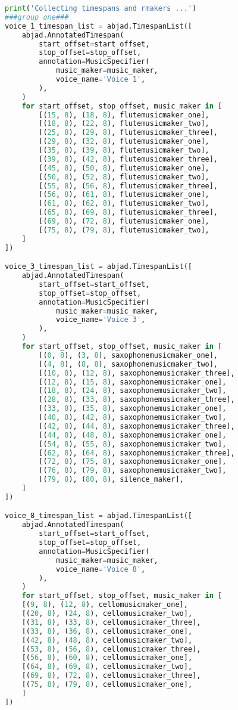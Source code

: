\begin{lstlisting}[language=Python, caption=Four Ages of Sand Segment\_II]
print('Collecting timespans and rmakers ...')
###group one###
voice_1_timespan_list = abjad.TimespanList([
    abjad.AnnotatedTimespan(
        start_offset=start_offset,
        stop_offset=stop_offset,
        annotation=MusicSpecifier(
            music_maker=music_maker,
            voice_name='Voice 1',
        ),
    )
    for start_offset, stop_offset, music_maker in [
        [(15, 8), (18, 8), flutemusicmaker_one],
        [(18, 8), (22, 8), flutemusicmaker_two],
        [(25, 8), (29, 8), flutemusicmaker_three],
        [(29, 8), (32, 8), flutemusicmaker_one],
        [(35, 8), (39, 8), flutemusicmaker_two],
        [(39, 8), (42, 8), flutemusicmaker_three],
        [(45, 8), (50, 8), flutemusicmaker_one],
        [(50, 8), (52, 8), flutemusicmaker_two],
        [(55, 8), (56, 8), flutemusicmaker_three],
        [(56, 8), (61, 8), flutemusicmaker_one],
        [(61, 8), (62, 8), flutemusicmaker_two],
        [(65, 8), (69, 8), flutemusicmaker_three],
        [(69, 8), (72, 8), flutemusicmaker_one],
        [(75, 8), (79, 8), flutemusicmaker_two],
    ]
])

voice_3_timespan_list = abjad.TimespanList([
    abjad.AnnotatedTimespan(
        start_offset=start_offset,
        stop_offset=stop_offset,
        annotation=MusicSpecifier(
            music_maker=music_maker,
            voice_name='Voice 3',
        ),
    )
    for start_offset, stop_offset, music_maker in [
        [(0, 8), (3, 8), saxophonemusicmaker_one],
        [(4, 8), (8, 8), saxophonemusicmaker_two],
        [(10, 8), (12, 8), saxophonemusicmaker_three],
        [(12, 8), (15, 8), saxophonemusicmaker_one],
        [(18, 8), (24, 8), saxophonemusicmaker_two],
        [(28, 8), (33, 8), saxophonemusicmaker_three],
        [(33, 8), (35, 8), saxophonemusicmaker_one],
        [(40, 8), (42, 8), saxophonemusicmaker_two],
        [(42, 8), (44, 8), saxophonemusicmaker_three],
        [(44, 8), (48, 8), saxophonemusicmaker_one],
        [(54, 8), (55, 8), saxophonemusicmaker_two],
        [(62, 8), (64, 8), saxophonemusicmaker_three],
        [(72, 8), (75, 8), saxophonemusicmaker_one],
        [(76, 8), (79, 8), saxophonemusicmaker_two],
        [(79, 8), (80, 8), silence_maker],
    ]
])

voice_8_timespan_list = abjad.TimespanList([
    abjad.AnnotatedTimespan(
        start_offset=start_offset,
        stop_offset=stop_offset,
        annotation=MusicSpecifier(
            music_maker=music_maker,
            voice_name='Voice 8',
        ),
    )
    for start_offset, stop_offset, music_maker in [
    [(9, 8), (12, 8), cellomusicmaker_one],
    [(20, 8), (24, 8), cellomusicmaker_two],
    [(31, 8), (33, 8), cellomusicmaker_three],
    [(33, 8), (36, 8), cellomusicmaker_one],
    [(42, 8), (48, 8), cellomusicmaker_two],
    [(53, 8), (56, 8), cellomusicmaker_three],
    [(56, 8), (60, 8), cellomusicmaker_one],
    [(64, 8), (69, 8), cellomusicmaker_two],
    [(69, 8), (72, 8), cellomusicmaker_three],
    [(75, 8), (79, 8), cellomusicmaker_one],
    ]
])


\end{lstlisting}
